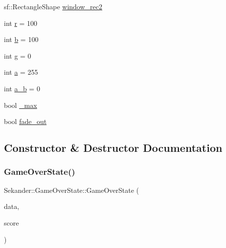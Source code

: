 \begin{DoxyCompactItemize}
sf\+::\+Rectangle\+Shape \hyperlink{classSekander_1_1GameOverState_afef7263e74fde41d6c779a473fd93105}{window\+\_\+rec2}
\item 
int \hyperlink{classSekander_1_1GameOverState_ac0f2e82316a36af6239ae24a03f2824f}{r} = 100
\item 
int \hyperlink{classSekander_1_1GameOverState_a48dbce2f5fb70dbaec0edf0d2de4aea6}{b} = 100
\item 
int \hyperlink{classSekander_1_1GameOverState_a7689bd10edad691528b434f0868c9e72}{g} = 0
\item 
int \hyperlink{classSekander_1_1GameOverState_a982c7e95494397743efa83e216ccd055}{a} = 255
\item 
int \hyperlink{classSekander_1_1GameOverState_aaf30770d2b2ab5f5be8a4d3443a2aa55}{a\+\_\+b} = 0
\item 
bool \hyperlink{classSekander_1_1GameOverState_a5656ae0aefaffa2409a51b1c3bd0f88c}{\+\_\+max}
\item 
bool \hyperlink{classSekander_1_1GameOverState_af8260bf3049c7b7cb7d2ea3781e3beae}{fade\+\_\+out}
\end{DoxyCompactItemize}


\subsection{Constructor \& Destructor Documentation}
\mbox{\label{classSekander_1_1GameOverState_a8248a663f0624ca7f1c081cd0174b396}} 
\subsubsection{\texorpdfstring{Game\+Over\+State()}{GameOverState()}\hspace{0.1cm}{\footnotesize\ttfamily [1/3]}}
{\footnotesize\ttfamily Sekander\+::\+Game\+Over\+State\+::\+Game\+Over\+State (\begin{DoxyParamCaption}\item[{\hyperlink{namespaceSekander_a1d69b002ba2d23020901c28f0def5e16}{Game\+Data\+Ref}}]{data,  }\item[{int}]{score }\end{DoxyParamCaption})}

\mbox{\label{classSekander_1_1GameOverState_a3e432a73ee48a8048c2d5a34226cae4b}} 
